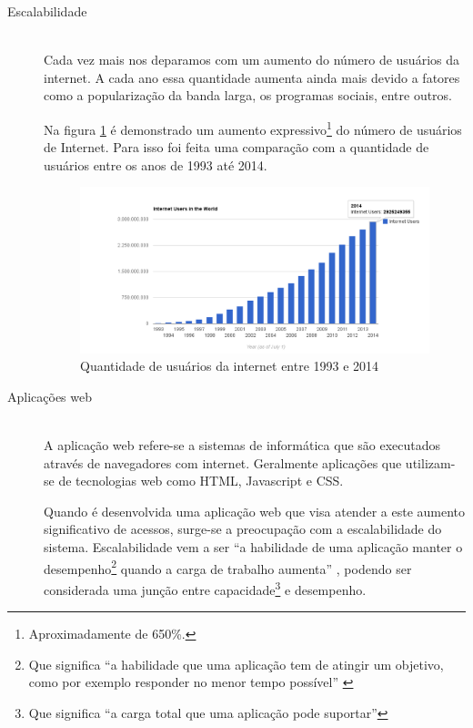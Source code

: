 \begin{description}
\item[Escalabilidade] \hfill \\
Cada vez mais nos deparamos com um aumento do número de usuários da internet. A cada ano essa quantidade aumenta ainda mais devido a fatores como a popularização da banda larga, os programas sociais, entre outros.

Na figura \ref{fig:Quantidade de usuários da internet entre 1993 e 2014} \cite{intStats} é demonstrado um aumento expressivo\footnote{Aproximadamente de 650\%.} do número de usuários de Internet. Para isso foi feita uma comparação com a quantidade de usuários  entre os anos de 1993 até 2014.

\begin{figure}[htb]
\centering
\includegraphics[scale=0.45]{images/internet_usage.png}
\caption{Quantidade de usuários da internet entre 1993 e 2014}
\label{fig:Quantidade de usuários da internet entre 1993 e 2014}
\end{figure}

\newpage

\item[Aplicações web] \hfill \\
A aplicação web refere-se a sistemas de informática que são executados através de navegadores com internet. Geralmente aplicações que utilizam-se de tecnologias web como HTML, Javascript e CSS.\cite{appWeb}

Quando é desenvolvida uma aplicação web que visa atender a este aumento significativo de acessos, surge-se a preocupação com a escalabilidade do sistema. Escalabilidade vem a ser ``a habilidade de uma aplicação manter o desempenho\footnote{Que significa ``a habilidade que uma aplicação tem de atingir um objetivo, como por exemplo responder no menor tempo possível'' \cite{escTerm}} quando a carga de trabalho aumenta'' \cite{escTerm}, podendo ser considerada uma junção entre capacidade\footnote{Que significa ``a carga total que uma aplicação pode suportar''\cite{escTerm}} e desempenho. 



\end{description}
